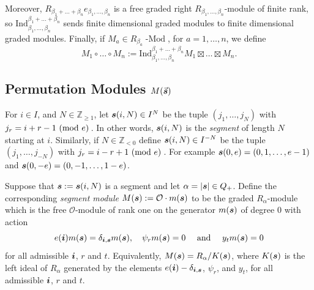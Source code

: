 \documentclass[twoside,11pt,reqno]{amsart}
\numberwithin{equation}{section}
\theoremstyle{definition}  %
\def\bi{\text{\boldmath$i$}}
\def\bs{\text{\boldmath$s$}}
\def\pmod#1{\text{ }(\text{\rm mod } #1)\,}
\newcommand{\Z}{\mathbb{Z}}
\newcommand{\0}{{\bar 0}}
\newcommand{\1}{{\bar 1}}
\newcommand{\al}{\alpha}
\newcommand{\de}{\delta}
\newcommand{\Ind}{{\mathrm {Ind}}}
\def\Mod#1{#1\!\operatorname{-Mod}}
\renewcommand\O{\mathcal O}
\begin{document}
Moreover,  $R_{\beta_1+\dots+\beta_n} e_{\beta_1,\dots,\beta_n}$ is a
free graded right $R_{\beta_1,\dots,\beta_n}$-module of finite rank, so
$\Ind_{\beta_1,\dots,\beta_n}^{\beta_1+\dots+\beta_n}$ sends finite dimensional graded modules to finite dimensional graded modules. Finally, if $M_a\in\Mod{R_{\beta_a}}$, for $a=1,\dots,n$, we define 
\begin{equation}\label{ECircProd}
M_1\circ\dots\circ M_n:=\Ind_{\beta_1,\dots,\beta_n}^{\beta_1+\dots+\beta_n}M_1\boxtimes\dots\boxtimes M_n. 
\end{equation}



\subsection{\boldmath Permutation Modules $M(\vec{\bs})$}\label{SSPerm}
For $i\in I$, and $N\in \Z_{\geq 1}$, let $\bs(i,N)\in I^N$ be the tuple $(j_1,\dots,j_N)$ with $j_r=i+r-1\pmod
e$. In other words, $\bs(i,N)$ is the {\em segment} of length $N$ starting at $i$. Similarly, if $N\in\Z_{<0}$
define $\bs(i,N)\in I^{-N}$ be the tuple $(j_1,\dots,j_{-N})$ with $j_r=i-r+1\pmod e$. For example
$\bs(0,e)=(0,1,\dots,e-1)$ and $\bs(0,-e)=(0,-1,\dots,1-e)$. 

Suppose that $\bs:=\bs(i,N)$ is a segment and let $\al=|\bs|\in Q_+$.  Define the corresponding {\em segment module}
$M(\bs):=\O\cdot m(\bs)$ to be the graded $R_\al$-module which is the free $\O$-module of rank one on the
generator $m(\bs)$ of degree $0$ with action  
\begin{equation*}
e(\bi)m(\bs)=\de_{\bi,\bs}m(\bs), \quad \psi_rm(\bs)=0\quad\text{ and }\quad y_tm(\bs)=0
\end{equation*}
for all admissible $\bi$, $r$ and $t$.  Equivalently, $M(\bs)=R_\al/K(\bs)$, where $K(\bs)$ is
the left ideal of $R_\al$ generated by the elements $e(\bi)-\de_{\bi,\bs}$, $\psi_r$, and $y_t$, for all
admissible $\bi$, $r$ and $t$. 
\end{document}

